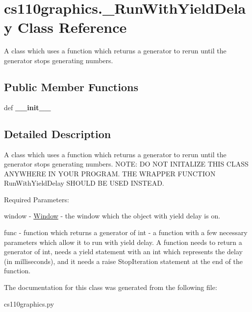 \hypertarget{classcs110graphics_1_1__RunWithYieldDelay}{
\section{cs110graphics.\_\-RunWithYieldDelay Class Reference}
\label{classcs110graphics_1_1__RunWithYieldDelay}
}


A class which uses a function which returns a generator to rerun until the generator stops generating numbers.  
\subsection*{Public Member Functions}
\begin{DoxyCompactItemize}
\item 
\hypertarget{classcs110graphics_1_1__RunWithYieldDelay_a996b2bc2d41832713f121a90453c9c37}{
def {\bfseries \_\-\_\-init\_\-\_\-}}
\label{classcs110graphics_1_1__RunWithYieldDelay_a996b2bc2d41832713f121a90453c9c37}

\end{DoxyCompactItemize}


\subsection{Detailed Description}
A class which uses a function which returns a generator to rerun until the generator stops generating numbers. NOTE: DO NOT INITALIZE THIS CLASS ANYWHERE IN YOUR PROGRAM. THE WRAPPER FUNCTION RunWithYieldDelay SHOULD BE USED INSTEAD.

Required Parameters:
\begin{DoxyItemize}
\item window -\/ \hyperlink{classcs110graphics_1_1Window}{Window} -\/ the window which the object with yield delay is on.
\item func -\/ function which returns a generator of int -\/ a function with a few necessary parameters which allow it to run with yield delay. A function needs to return a generator of int, needs a yield statement with an int which represents the delay (in milliseconds), and it needs a raise StopIteration statement at the end of the function. 
\end{DoxyItemize}

The documentation for this class was generated from the following file:\begin{DoxyCompactItemize}
\item 
cs110graphics.py\end{DoxyCompactItemize}
